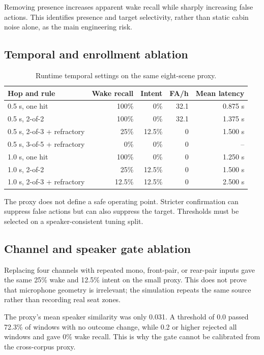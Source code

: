 \documentclass[11pt,a4paper]{article}
\begin{document}
Removing presence increases apparent wake recall while sharply increasing
false actions. This identifies presence and target selectivity, rather than
static cabin noise alone, as the main engineering risk.

\subsection{Temporal and enrollment ablation}

\begin{table}[H]
\centering
\caption{Runtime temporal settings on the same eight-scene proxy.}
\label{tab:temporal}
\small
\begin{tabular}{@{}lrrrr@{}}
\toprule
\textbf{Hop and rule} & \textbf{Wake recall} & \textbf{Intent} & \textbf{FA/h} & \textbf{Mean latency}\\
\midrule
0.5 s, one hit & 100\% & 0\% & 32.1 & 0.875 s\\
0.5 s, 2-of-2 & 100\% & 0\% & 32.1 & 1.375 s\\
0.5 s, 2-of-3 + refractory & 25\% & 12.5\% & 0 & 1.500 s\\
0.5 s, 3-of-5 + refractory & 0\% & 0\% & 0 & --\\
1.0 s, one hit & 100\% & 0\% & 0 & 1.250 s\\
1.0 s, 2-of-2 & 25\% & 12.5\% & 0 & 1.500 s\\
1.0 s, 2-of-3 + refractory & 12.5\% & 12.5\% & 0 & 2.500 s\\
\bottomrule
\end{tabular}
\end{table}

The proxy does not define a safe operating point. Stricter confirmation can
suppress false actions but can also suppress the target. Thresholds must be
selected on a speaker-consistent tuning split.

\subsection{Channel and speaker gate ablation}

Replacing four channels with repeated mono, front-pair, or rear-pair inputs
gave the same 25\% wake and 12.5\% intent on the small proxy. This does not
prove that microphone geometry is irrelevant; the simulation repeats the
same source rather than recording real seat zones.

The proxy's mean speaker similarity was only 0.031. A threshold of 0.0 passed
72.3\% of windows with no outcome change, while 0.2 or higher rejected all
windows and gave 0\% wake recall. This is why the gate cannot be calibrated
from the cross-corpus proxy.
\end{document}
